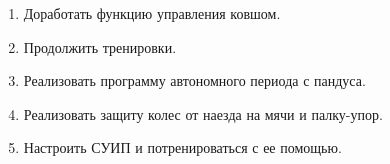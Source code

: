 \begin{enumerate}
\begin{enumerate}
		\item Доработать функцию управления ковшом.
		
		\item Продолжить тренировки.
		
        \item Реализовать программу автономного периода с пандуса.
        
        \item Реализовать защиту колес от наезда на мячи и палку-упор.
        
        \item Настроить СУИП и потренироваться с ее помощью.
			
	\end{enumerate}
\end{enumerate}
\fillpage
